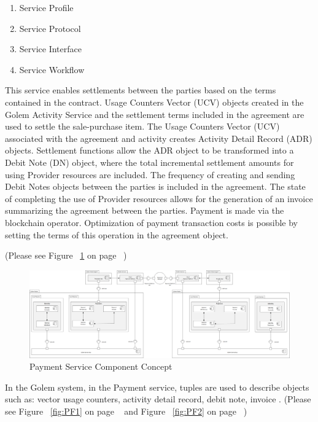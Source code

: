 \begin{enumerate}
    \item Service Profile
    \item Service Protocol
    \item Service Interface
    \item Service Workflow
\end{enumerate}


This service enables settlements between the parties based on the terms contained in the contract. 
Usage Counters Vector (UCV) objects created in the Golem Activity Service and the settlement terms included in the agreement 
are used to settle the sale-purchase item. The Usage Counters Vector (UCV) associated with the agreement and activity creates 
Activity Detail Record (ADR) objects. Settlement functions allow the ADR object to be transformed into a Debit Note (DN) object, 
where the total incremental settlement amounts for using Provider resources are included. The frequency of creating and sending 
Debit Notes objects between the parties is included in the agreement. The state of completing the use of Provider resources allows 
for the generation of an invoice summarizing the agreement between the parties. 
Payment is made via the blockchain operator. Optimization of payment transaction costs is possible by setting the terms of this operation 
in the agreement object.

(Please see Figure ~\ref{fig:PSCC} on page ~\pageref{fig:PSCC})

\begin{figure}[H]
    \centering
    \includegraphics[width=18cm,angle=0]{./diag/Reference/PaymentService-Reference.png}
	\caption{Payment Service Component Concept}
    \label{fig:PSCC}
\end{figure}



In the Golem system, in the Payment service, tuples are used to describe objects such as:
vector usage counters, activity detail record, debit note, invoice . 
(Please see Figure ~\ref{fig:PF1} on page ~\pageref{fig:PF1} and Figure ~\ref{fig:PF2} on page ~\pageref{fig:PF2})

